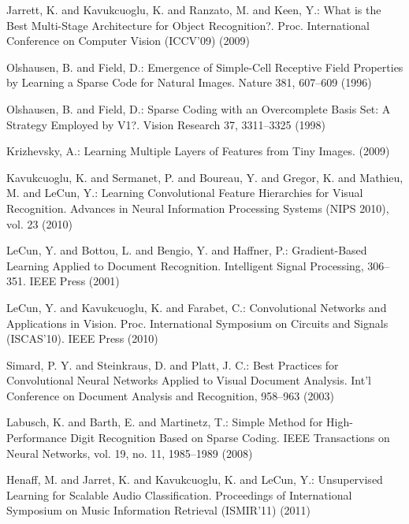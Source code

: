 \documentclass[runningheads,a4paper]{llncs}
\begin{document}
\begin{thebibliography}{4}

 Jarrett, K. and Kavukcuoglu, K. and Ranzato, M. and Keen, Y.: What is the Best Multi-Stage Architecture for Object Recognition?. Proc. International Conference on Computer Vision (ICCV'09) (2009)

 Olshausen, B. and Field, D.: Emergence of Simple-Cell Receptive Field Properties by Learning a Sparse Code for Natural Images. Nature 381, 607--609 (1996)

 Olshausen, B. and Field, D.: Sparse Coding with an Overcomplete Basis Set: A Strategy Employed by V1?. Vision Research 37, 3311--3325 (1998)

 Krizhevsky, A.: Learning Multiple Layers of Features from Tiny Images. (2009)

 Kavukcuoglu, K. and Sermanet, P. and Boureau, Y. and Gregor, K. and Mathieu, M. and LeCun, Y.: Learning Convolutional Feature Hierarchies for Visual Recognition. Advances in Neural Information Processing Systems (NIPS 2010), vol. 23 (2010)

 LeCun, Y. and Bottou, L. and Bengio, Y. and Haffner, P.: Gradient-Based Learning Applied to Document Recognition. Intelligent Signal Processing, 306--351. IEEE Press (2001)

 LeCun, Y. and Kavukcuoglu, K. and Farabet, C.: Convolutional Networks and Applications in Vision. Proc. International Symposium on Circuits and Signals (ISCAS'10). IEEE Press (2010)

 Simard, P. Y. and Steinkraus, D. and Platt, J. C.: Best Practices for Convolutional Neural Networks Applied to Visual Document Analysis. Int'l Conference on Document Analysis and Recognition, 958--963 (2003)

 Labusch, K. and Barth, E. and Martinetz, T.: Simple Method for High-Performance Digit Recognition Based on Sparse Coding. IEEE Transactions on Neural Networks, vol. 19, no. 11, 1985--1989 (2008)

 Henaff, M. and Jarret, K. and Kavukcuoglu, K. and LeCun, Y.: Unsupervised Learning for Scalable Audio Classification. Proceedings of International Symposium on Music Information Retrieval (ISMIR'11) (2011)


\end{thebibliography}
\end{document}
